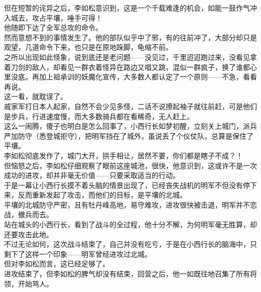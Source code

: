 \begin{multicols}{\theparacolNo}
但在短暂的诧异之后，李如松意识到，这是一个千载难逢的机会，如能一鼓作气冲入城去，攻占平壤，唾手可得！\\

他随即下达了全军总攻的命令。\\

然而意想不到的事情发生了。他的部队似乎中了邪，有的往前冲了，大部分却只是观望，几道命令下来，也只是在原地跺脚，龟缩不前。\\

之所以出现如此怪象，说到底还是老问题——没见过，千里迢迢跑过来，没看见拿着刀剑的敌人，却看见一群衣着怪异在路边又唱又跳，混似一群疯子，换了谁都心里没底。再加上祖承训的妖魔化宣传，大多数人都认定了一个原则——不急，看看再说。\\

这一看，就耽误了。\\

戚家军打日本人起家，自然不会少见多怪，二话不说撩起袖子就往前赶，可是他们是步兵，行进速度慢，而大多数骑兵都在看稀奇，无人赶上。\\

这么一闹腾，傻子也明白是怎么回事了，小西行长如梦初醒，立刻关上城门，派兵严加防守（悉登城拒守），把明军挡在了城外，虽说丢了个仪仗队，总算是保住了平壤。\\

李如松彻底发作了，城门大开，拱手相让，居然不要，你们都是瞎子不成？！\\

但恼怒之后，李如松仔细观察了眼前这座城池，很快，他意识到，这或许不是一次成功的进攻，却并非毫无价值——只要采取适当的行动。\\

于是一幕让小西行长摸不着头脑的情景出现了，已经丧失战机的明军不但没有停下来，反而重新发起了攻击，而他们的目标，是平壤的北城。\\

平壤的北城防守严密，且有牡丹峰高地，易守难攻，进攻很快被击退，明军并不恋战，撤兵而去。\\

站在城头的小西行长，看到了战斗的全过程，他十分不解，为何明军毫无胜算，却还要攻击此地。\\

不过无论如何，这次战斗结束了，自己并没有吃亏，于是在小西行长的脑海中，只剩下了这样一个印象——明军曾经进攻过北城。\\

但对李如松而言，这已经足够了。\\

进攻结束了，但李如松的脾气却没有结束，回营之后，他一如既往地召集了所有将领，开始骂人。\\


\end{multicols}
